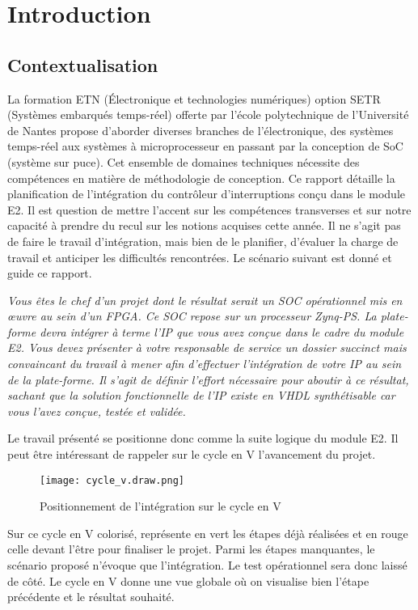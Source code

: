 \section{Introduction}

\subsection{Contextualisation}
La formation ETN (Électronique et technologies numériques) option SETR (Systèmes embarqués temps-réel) offerte par l'école polytechnique de l'Université de Nantes propose d'aborder diverses branches de l'électronique, des systèmes temps-réel aux systèmes à microprocesseur en passant par la conception de SoC (système sur puce). 
Cet ensemble de domaines techniques nécessite des compétences en matière de méthodologie de conception. 
Ce rapport détaille la planification de l'intégration du contrôleur d'interruptions conçu dans le module E2.
Il est question de mettre l'accent sur les compétences transverses et sur notre capacité à prendre du recul sur les notions acquises cette année.
Il ne s'agit pas de faire le travail d'intégration, mais bien de le planifier, d'évaluer la charge de travail et anticiper les difficultés rencontrées.
Le scénario suivant est donné et guide ce rapport.

\gap

\textit{ Vous êtes le chef d'un projet dont le résultat serait un SOC opérationnel mis en œuvre au sein d’un FPGA. 
Ce SOC repose sur un processeur Zynq-PS. 
La plate-forme devra intégrer à terme l'IP que vous avez conçue dans le cadre du module E2. 
Vous devez présenter à votre responsable de service un dossier succinct mais convaincant du travail à mener afin d’effectuer l’intégration de votre IP au sein de la plate-forme. 
Il s’agit de définir l'effort nécessaire pour aboutir à ce résultat, sachant que la solution fonctionnelle de l'IP existe en VHDL synthétisable car vous l'avez conçue, testée et validée.}

\gap

Le travail présenté se positionne donc comme la suite logique du module E2.
Il peut être intéressant de rappeler sur le cycle en V l'avancement du projet.
\begin{figure}[H]
    \centering
    \texttt{[image: cycle\_v.draw.png]}
    \caption{Positionnement de l'intégration sur le cycle en V}
    \label{fig:cycle_v}
\end{figure}
Sur ce cycle en V colorisé, représente en vert les étapes déjà réalisées et en rouge celle devant l'être pour finaliser le projet.
Parmi les étapes manquantes, le scénario proposé n'évoque que l'intégration.
Le test opérationnel sera donc laissé de côté.
Le  cycle en V donne une vue globale où on visualise bien l'étape précédente et le résultat souhaité.



